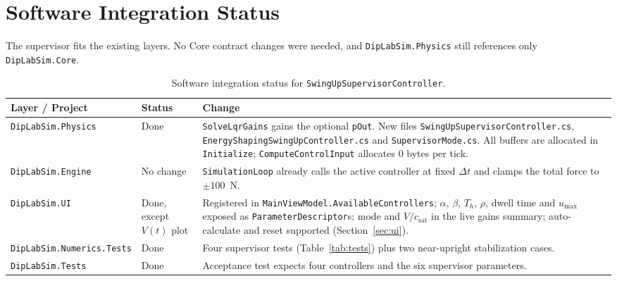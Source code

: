 \documentclass[11pt,a4paper]{article}
\newcommand{\code}[1]{\texttt{#1}}
\newcommand{\csat}{c_{\mathrm{sat}}}
\newcommand{\umax}{u_{\max}}
\begin{document}
\section{Software Integration Status}
The supervisor fits the existing layers. No Core contract changes were needed, and
\code{DipLabSim.Physics} still references only \code{DipLabSim.Core}.

\begin{table}[h]
\centering
\begin{tabularx}{\linewidth}{@{}l l X@{}}
\toprule
Layer / Project & Status & Change \\
\midrule
\code{DipLabSim.Physics} & Done &
\code{SolveLqrGains} gains the optional \code{pOut}. New files
\code{SwingUpSupervisorController.cs}, \code{EnergyShapingSwingUpController.cs} and
\code{SupervisorMode.cs}. All buffers are allocated in \code{Initialize};
\code{ComputeControlInput} allocates 0 bytes per tick. \\
\code{DipLabSim.Engine} & No change &
\code{SimulationLoop} already calls the active controller at fixed $\Delta t$ and clamps the
total force to $\pm 100$~N. \\
\code{DipLabSim.UI} & Done, except $V(t)$ plot &
Registered in \code{MainViewModel.AvailableControllers}; $\alpha$, $\beta$, $T_h$, $\rho$,
dwell time and $\umax$ exposed as \code{ParameterDescriptor}s; mode and $V/\csat$ in the live
gains summary; auto-calculate and reset supported (Section~\ref{sec:ui}). \\
\code{DipLabSim.Numerics.Tests} & Done &
Four supervisor tests (Table~\ref{tab:tests}) plus two near-upright stabilization cases. \\
\code{DipLabSim.Tests} & Done &
Acceptance test expects four controllers and the six supervisor parameters. \\
\bottomrule
\end{tabularx}
\caption{Software integration status for \code{SwingUpSupervisorController}.}
\label{tab:status}
\end{table}
\end{document}
